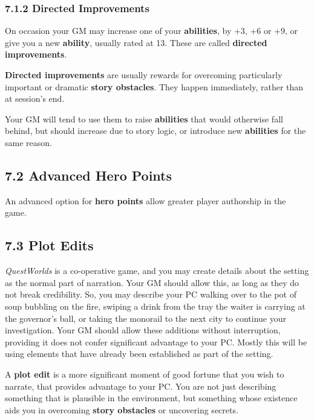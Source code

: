 \documentclass[
]{article}
\begin{document}
\hypertarget{directed-improvements}{%
\subsubsection{7.1.2 Directed
Improvements}\label{directed-improvements}}

On occasion your GM may increase one of your \textbf{abilities}, by +3,
+6 or +9, or give you a new \textbf{ability}, usually rated at 13. These
are called \textbf{directed improvements}.

\textbf{Directed improvements} are usually rewards for overcoming
particularly important or dramatic \textbf{story obstacles}. They happen
immediately, rather than at session's end.

Your GM will tend to use them to raise \textbf{abilities} that would
otherwise fall behind, but should increase due to story logic, or
introduce new \textbf{abilities} for the same reason.

\hypertarget{advanced-hero-points}{%
\subsection{7.2 Advanced Hero Points}\label{advanced-hero-points}}

An advanced option for \textbf{hero points} allow greater player
authorship in the game.

\hypertarget{plot-edits}{%
\subsection{7.3 Plot Edits}\label{plot-edits}}

\emph{QuestWorlds} is a co-operative game, and you may create details
about the setting as the normal part of narration. Your GM should allow
this, as long as they do not break credibility. So, you may describe
your PC walking over to the pot of soup bubbling on the fire, swiping a
drink from the tray the waiter is carrying at the governor's ball, or
taking the monorail to the next city to continue your investigation.
Your GM should allow these additions without interruption, providing it
does not confer significant advantage to your PC. Mostly this will be
using elements that have already been established as part of the
setting.

A \textbf{plot edit} is a more significant moment of good fortune that
you wish to narrate, that provides advantage to your PC. You are not
just describing something that is plausible in the environment, but
something whose existence aids you in overcoming \textbf{story
obstacles} or uncovering secrets.
\end{document}
